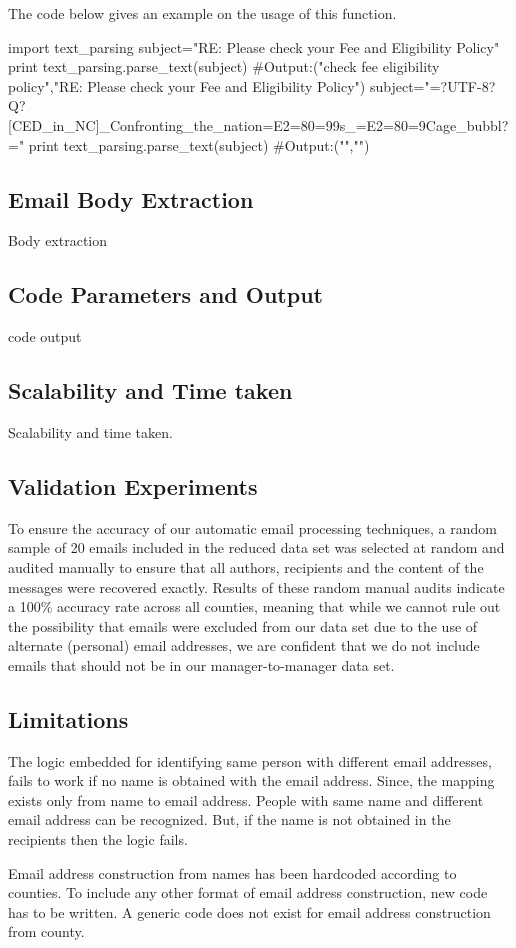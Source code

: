 \documentclass[fleqn]{MJDArticle}
\begin{document}
\par
The code below gives an example on the usage of this function. 
\begin{code}
import text_parsing
subject="RE: Please check your Fee and Eligibility Policy"
print text_parsing.parse_text(subject)
#Output:("check fee eligibility policy","RE: Please check your Fee and Eligibility Policy")
subject="=?UTF-8?Q?[CED_in_NC]_Confronting_the_nation=E2=80=99s_=E2=80=9Cage_bubbl?="
print text_parsing.parse_text(subject)
#Output:("","")
\end{code}
\subsection{Email Body Extraction}
Body extraction
\subsection{Code Parameters and Output}
code output
\subsection{Scalability and Time taken}
Scalability and time taken.

\subsection{Validation Experiments}

To ensure the accuracy of our automatic email processing techniques, a random sample of 20 emails included in the reduced data set was selected at random and audited manually to ensure that all authors, recipients and the content of the messages were recovered exactly. Results of these random manual audits indicate a 100\% accuracy rate across all counties, meaning that while we cannot rule out the possibility that emails were excluded from our data set due to the use of alternate (personal) email addresses, we are confident that we do not include emails that should not be in our manager-to-manager data set.

\subsection{Limitations}
The logic embedded for identifying same person with different email addresses, fails to work if no name is obtained with the email address. Since, the mapping exists only from name to email address. People with same name and different email address can be recognized. But, if the name is not obtained in the recipients then the logic fails. 
\par 
Email address construction from names has been hardcoded according to counties. To include any other format of email address construction, new code has to be written. A generic code does not exist for email address construction from county.
\end{document}
